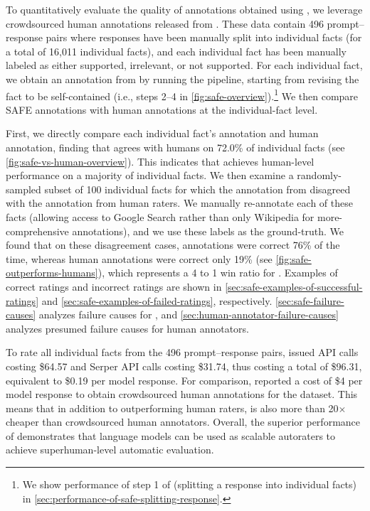 \documentclass{article}
\theoremstyle{plain}
\theoremstyle{definition}
\theoremstyle{remark}
\begin{document}
To quantitatively evaluate the quality of annotations obtained using \safe{}, we leverage crowdsourced human annotations released from \citet{min2023factscore}.
These data contain 496 prompt--response pairs where responses have been manually split into individual facts (for a total of 16,011 individual facts), and each individual fact has been manually labeled as either supported, irrelevant, or not supported.
For each individual fact, we obtain an annotation from \safe{} by running the \safe{} pipeline, starting from revising the fact to be self-contained (i.e., steps 2--4 in \cref{fig:safe-overview}).\footnote{We show performance of step 1 of \safe{} (splitting a response into individual facts) in \cref{sec:performance-of-safe-splitting-response}.}
We then compare SAFE annotations with human annotations at the individual-fact level.

First, we directly compare each individual fact's \safe{} annotation and human annotation, finding that \safe{} agrees with humans on 72.0\% of individual facts (see \cref{fig:safe-vs-human-overview}).
This indicates that \safe{} achieves human-level performance on a majority of individual facts.
We then examine a randomly-sampled subset of 100 individual facts for which the annotation from \safe{} disagreed with the annotation from human raters.
We manually re-annotate each of these facts (allowing access to Google Search rather than only Wikipedia for more-comprehensive annotations), and we use these labels as the ground-truth.
We found that on these disagreement cases, \safe{} annotations were correct 76\% of the time, whereas human annotations were correct only 19\% (see \cref{fig:safe-outperforms-humans}), which represents a 4 to 1 win ratio for \safe{}.
Examples of correct \safe{} ratings and incorrect \safe{} ratings are shown in \cref{sec:safe-examples-of-successful-ratings} and \cref{sec:safe-examples-of-failed-ratings}, respectively.
\cref{sec:safe-failure-causes} analyzes failure causes for \safe{}, and \cref{sec:human-annotator-failure-causes} analyzes presumed failure causes for human annotators.

To rate all individual facts from the 496 prompt--response pairs, \safe{} issued \chatgpt{} API calls costing \$64.57 and Serper API calls costing \$31.74, thus costing a total of \$96.31, equivalent to \$0.19 per model response.
For comparison, \citet{min2023factscore} reported a cost of \$4 per model response to obtain crowdsourced human annotations for the dataset.
This means that in addition to outperforming human raters, \safe{} is also more than 20$\times$ cheaper than crowdsourced human annotators.
Overall, the superior performance of \safe{} demonstrates that language models can be used as scalable autoraters to achieve superhuman-level automatic evaluation.
\end{document}
